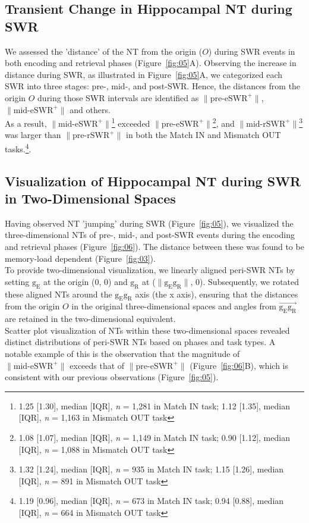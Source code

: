 \documentclass[preprint,review,12pt]{elsarticle}%
\begin{document}
\subsection{Transient Change in Hippocampal NT during SWR}
We assessed the 'distance' of the NT from the origin ($O$) during SWR events in both encoding and retrieval phases (Figure~\ref{fig:05}A). Observing the increase in distance during SWR, as illustrated in Figure~\ref{fig:05}A, we categorized each SWR into three stages: pre-, mid-, and post-SWR. Hence, the distances from the origin $O$ during those SWR intervals are identified as $\mathrm{\lVert \text{pre-eSWR}^+ \rVert}$, $\mathrm{\lVert \text{mid-eSWR}^+ \rVert}$ and others.
\\
\indent
As a result, $\mathrm{\lVert \text{mid-eSWR}^+ \rVert}$\footnote{1.25 [1.30], median [IQR], \textit{n} = 1,281 in Match IN task; 1.12 [1.35], median [IQR], \textit{n} = 1,163 in Mismatch OUT task} exceeded $\mathrm{\lVert \text{pre-eSWR}^+ \rVert}$\footnote{1.08 [1.07], median [IQR], \textit{n} = 1,149 in Match IN task; 0.90 [1.12], median [IQR], \textit{n} = 1,088 in Mismatch OUT task}, and $\mathrm{\lVert \text{mid-rSWR}^+ \rVert}$\footnote{1.32 [1.24], median [IQR], \textit{n} = 935 in Match IN task; 1.15 [1.26], median [IQR], \textit{n} = 891 in Mismatch OUT task} was larger than $\mathrm{\lVert \text{pre-rSWR}^+ \rVert}$ in both the Match IN and Mismatch OUT tasks.\footnote{1.19 [0.96], median [IQR], \textit{n} = 673 in Match IN task; 0.94 [0.88], median [IQR], \textit{n} = 664 in Mismatch OUT task}.

\subsection{Visualization of Hippocampal NT during SWR in Two-Dimensional Spaces}
Having observed NT 'jumping' during SWR (Figure~\ref{fig:05}), we visualized the three-dimensional NTs of pre-, mid-, and post-SWR events during the encoding and retrieval phases (Figure~\ref{fig:06}). The distance between these was found to be memory-load dependent (Figure~\ref{fig:03}). 
\\
\indent
To provide two-dimensional visualization, we linearly aligned peri-SWR NTs by setting $\mathrm{g_{E}}$ at the origin (0, 0) and $\mathrm{g_{R}}$ at ($\mathrm{\lVert g_{E}g_{R} \rVert}$, 0). Subsequently, we rotated these aligned NTs around the $\mathrm{g_{E}g_{R}}$ axis (the x axis), ensuring that the distances from the origin $O$ in the original three-dimensional spaces and angles from $\overrightarrow{\mathrm{g_{E}g_{R}}}$ are retained in the two-dimensional equivalent.
\\
\indent
Scatter plot visualization of NTs within these two-dimensional spaces revealed distinct distributions of peri-SWR NTs based on phases and task types. A notable example of this is the observation that the magnitude of  $\mathrm{\lVert \text{mid-eSWR}^+ \rVert}$ exceeds that of $\mathrm{\lVert \text{pre-eSWR}^+ \rVert}$ (Figure~\ref{fig:06}B), which is consistent with our previous observations (Figure~\ref{fig:05}).
\end{document}
